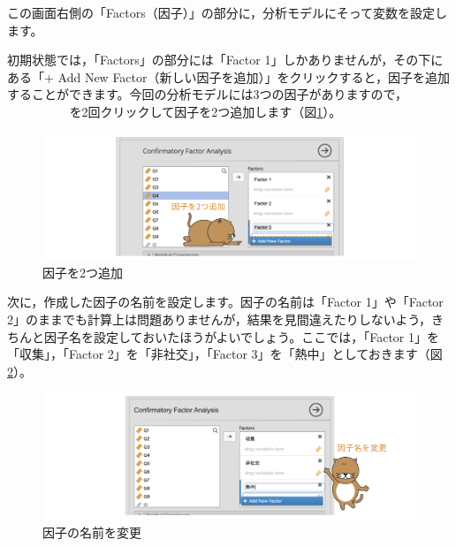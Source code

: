 \documentclass[
  12pt,
  a5jpaper,
  lualatex, ja=standard]{bxjsbook}
\begin{document}
この画面右側の「Factors（因子）」の部分に，分析モデルにそって変数を設定します。

初期状態では，「Factors」の部分には「Factor 1」しかありませんが，その下にある「+ Add New Factor（新しい因子を追加）」をクリックすると，因子を追加することができます。今回の分析モデルには3つの因子がありますので，\colorbox{ao}{\textcolor{white}{+ Add New Factor}}を2回クリックして因子を2つ追加します（図\ref{fig:factor-cfa-add-factors}）。

\begin{figure}[!ht]

{\centering \includegraphics[width=1\linewidth]{images/factor/cfa-add-factors} 

}

\caption{因子を2つ追加}\label{fig:factor-cfa-add-factors}
\end{figure}

次に，作成した因子の名前を設定します。因子の名前は「Factor 1」や「Factor 2」のままでも計算上は問題ありませんが，結果を見間違えたりしないよう，きちんと因子名を設定しておいたほうがよいでしょう。ここでは，「Factor 1」を「収集」，「Factor 2」を「非社交」，「Factor 3」を「熱中」としておきます（図\ref{fig:factor-cfa-rename-factors}）。

\begin{figure}[!ht]

{\centering \includegraphics[width=1\linewidth]{images/factor/cfa-rename-factors} 

}

\caption{因子の名前を変更}\label{fig:factor-cfa-rename-factors}
\end{figure}
\end{document}
